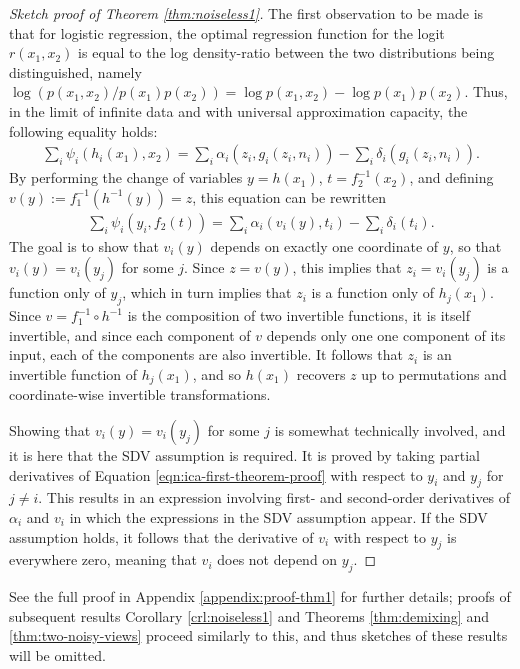 \begin{proof}[Sketch proof of Theorem \ref{thm:noiseless1}]
The first observation to be made is that for logistic regression, the optimal regression function for the logit $r(x_1, x_2)$ is equal to the log density-ratio between the two distributions being distinguished, namely $\log\left( p(x_1, x_2) / p(x_1)p(x_2)\right) = \log p(x_1, x_2) - \log p(x_1)p(x_2)$.
Thus, in the limit of infinite data and with universal approximation capacity, the following equality holds:
%
\begin{align*}
\sum_{i}\psi_{i}(h_{i}({x}_{1}),{x}_{2}) = \sum_i \alpha_i(z_i, g_i(z_i, n_i)) - \sum_i \delta_i(g_i(z_i, n_i)).
\end{align*}
%
By performing the change of variables $y=h(x_1)$, $t=f_2^{-1}(x_2)$, and defining $v(y) := f_1^{-1}(h^{-1}(y)) = z$, this equation can be rewritten
%
\begin{align}
\sum_{i}\psi_{i}(y_i,f_2(t)) = \sum_i \alpha_i(v_i(y), t_i) - \sum_i \delta_i(t_i). \label{eqn:ica-first-theorem-proof}
\end{align}
%
The goal is to show that $v_i(y)$ depends on exactly one coordinate of $y$, so that $v_i(y) = v_i(y_j)$ for some $j$. 
Since $z = v(y)$, this implies that $z_i = v_i(y_j)$ is a function only of $y_j$, which in turn implies that $z_i$ is a function only of $h_j(x_1)$. 
Since $v = f_1^{-1} \circ h^{-1}$ is the composition of two invertible functions, it is itself invertible, and since each component of $v$ depends only one one component of its input, each of the components are also invertible.
It follows that $z_i$ is an invertible function of $h_j(x_1)$, and so $h(x_1)$ recovers $z$ up to permutations and coordinate-wise invertible transformations.

Showing that $v_i(y) = v_i(y_j)$ for some $j$ is somewhat technically involved, and it is here that the SDV assumption is required.
It is proved by taking partial derivatives of Equation \ref{eqn:ica-first-theorem-proof} with respect to $y_i$ and $y_j$ for $j\not=i$. 
This results in an expression involving first- and second-order derivatives of $\alpha_i$ and $v_i$ in which the expressions in the SDV assumption appear. 
If the SDV assumption holds, it follows that the derivative of $v_i$ with respect to $y_j$ is everywhere zero, meaning that $v_i$ does not depend on $y_j$. 
\end{proof}

See the full proof in Appendix \ref{appendix:proof-thm1} for further details; proofs of subsequent results Corollary \ref{crl:noiseless1} and Theorems \ref{thm:demixing} and \ref{thm:two-noisy-views} proceed similarly to this, and thus sketches of these results will be omitted.

